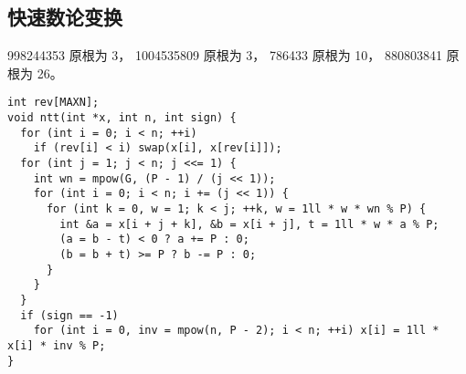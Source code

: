 \subsection{快速数论变换}
998244353 原根为 3，
1004535809 原根为 3，
786433 原根为 10，
880803841 原根为 26。
\begin{lstlisting}
int rev[MAXN];
void ntt(int *x, int n, int sign) {
  for (int i = 0; i < n; ++i)
    if (rev[i] < i) swap(x[i], x[rev[i]]);
  for (int j = 1; j < n; j <<= 1) {
    int wn = mpow(G, (P - 1) / (j << 1));
    for (int i = 0; i < n; i += (j << 1)) {
      for (int k = 0, w = 1; k < j; ++k, w = 1ll * w * wn % P) {
        int &a = x[i + j + k], &b = x[i + j], t = 1ll * w * a % P;
        (a = b - t) < 0 ? a += P : 0;
        (b = b + t) >= P ? b -= P : 0;
      }
    }
  }
  if (sign == -1)
    for (int i = 0, inv = mpow(n, P - 2); i < n; ++i) x[i] = 1ll * x[i] * inv % P;
}
\end{lstlisting}